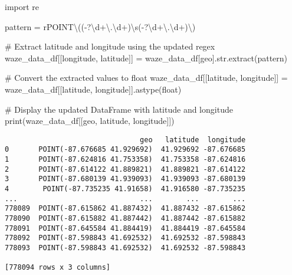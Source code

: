 \documentclass[
  letterpaper,
  DIV=11,
  numbers=noendperiod]{scrartcl}
\newenvironment{Shaded}{\begin{snugshade}}{\end{snugshade}}
\newcommand{\BuiltInTok}[1]{\textcolor[rgb]{0.00,0.23,0.31}{#1}}
\newcommand{\CommentTok}[1]{\textcolor[rgb]{0.37,0.37,0.37}{#1}}
\newcommand{\ImportTok}[1]{\textcolor[rgb]{0.00,0.46,0.62}{#1}}
\newcommand{\NormalTok}[1]{\textcolor[rgb]{0.00,0.23,0.31}{#1}}
\newcommand{\OperatorTok}[1]{\textcolor[rgb]{0.37,0.37,0.37}{#1}}
\newcommand{\StringTok}[1]{\textcolor[rgb]{0.13,0.47,0.30}{#1}}
\newcommand{\VerbatimStringTok}[1]{\textcolor[rgb]{0.13,0.47,0.30}{#1}}
\begin{document}
\begin{Shaded}
\begin{Highlighting}[]
\ImportTok{import}\NormalTok{ re}

\NormalTok{pattern }\OperatorTok{=} \VerbatimStringTok{r\textquotesingle{}POINT\textbackslash{}(({-}?\textbackslash{}d+\textbackslash{}.\textbackslash{}d+)\textbackslash{}s({-}?\textbackslash{}d+\textbackslash{}.\textbackslash{}d+)\textbackslash{})\textquotesingle{}}

\CommentTok{\# Extract latitude and longitude using the updated regex}
\NormalTok{waze\_data\_df[[}\StringTok{\textquotesingle{}longitude\textquotesingle{}}\NormalTok{, }\StringTok{\textquotesingle{}latitude\textquotesingle{}}\NormalTok{]] }\OperatorTok{=}\NormalTok{ waze\_data\_df[}\StringTok{\textquotesingle{}geo\textquotesingle{}}\NormalTok{].}\BuiltInTok{str}\NormalTok{.extract(pattern)}

\CommentTok{\# Convert the extracted values to float}
\NormalTok{waze\_data\_df[[}\StringTok{\textquotesingle{}latitude\textquotesingle{}}\NormalTok{, }\StringTok{\textquotesingle{}longitude\textquotesingle{}}\NormalTok{]] }\OperatorTok{=}\NormalTok{ waze\_data\_df[[}\StringTok{\textquotesingle{}latitude\textquotesingle{}}\NormalTok{, }\StringTok{\textquotesingle{}longitude\textquotesingle{}}\NormalTok{]].astype(}\BuiltInTok{float}\NormalTok{)}

\CommentTok{\# Display the updated DataFrame with latitude and longitude}
\BuiltInTok{print}\NormalTok{(waze\_data\_df[[}\StringTok{\textquotesingle{}geo\textquotesingle{}}\NormalTok{, }\StringTok{\textquotesingle{}latitude\textquotesingle{}}\NormalTok{, }\StringTok{\textquotesingle{}longitude\textquotesingle{}}\NormalTok{]])}
\end{Highlighting}
\end{Shaded}

\begin{verbatim}
                                geo   latitude  longitude
0       POINT(-87.676685 41.929692)  41.929692 -87.676685
1       POINT(-87.624816 41.753358)  41.753358 -87.624816
2       POINT(-87.614122 41.889821)  41.889821 -87.614122
3       POINT(-87.680139 41.939093)  41.939093 -87.680139
4        POINT(-87.735235 41.91658)  41.916580 -87.735235
...                             ...        ...        ...
778089  POINT(-87.615862 41.887432)  41.887432 -87.615862
778090  POINT(-87.615882 41.887442)  41.887442 -87.615882
778091  POINT(-87.645584 41.884419)  41.884419 -87.645584
778092  POINT(-87.598843 41.692532)  41.692532 -87.598843
778093  POINT(-87.598843 41.692532)  41.692532 -87.598843

[778094 rows x 3 columns]
\end{verbatim}
\end{document}
